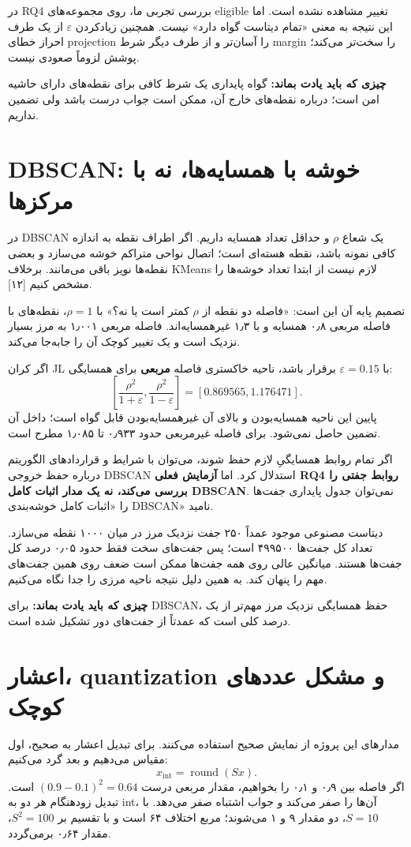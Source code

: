 \documentclass[11pt,a4paper]{article}
\newcommand{\lesson}[1]{\clearpage\section{#1}}
\newcommand{\takeaway}[1]{\par\textbf{چیزی که باید یادت بماند:} #1\par}
\begin{document}
در RQ4 بررسی تجربی ما، روی مجموعه‌های eligible تغییر مشاهده نشده است. اما این نتیجه به معنی «تمام دیتاست گواه دارد» نیست. همچنین زیادکردن \(\varepsilon\) از یک طرف احراز خطای projection را آسان‌تر و از طرف دیگر شرط margin را سخت‌تر می‌کند؛ پوشش لزوماً صعودی نیست.

\takeaway{گواه پایداری یک شرط کافی برای نقطه‌های دارای حاشیه امن است؛ درباره نقطه‌های خارج آن، ممکن است جواب درست باشد ولی تضمین نداریم.}

\lesson{DBSCAN: خوشه با همسایه‌ها، نه با مرکزها}
در DBSCAN یک شعاع \(\rho\) و حداقل تعداد همسایه  داریم. اگر اطراف نقطه به اندازه کافی نمونه باشد، نقطه هسته‌ای است؛ اتصال نواحی متراکم خوشه می‌سازد و بعضی نقطه‌ها نویز باقی می‌مانند. برخلاف KMeans لازم نیست از ابتدا تعداد خوشه‌ها را مشخص کنیم [۱۲].

تصمیم پایه آن این است: «فاصله دو نقطه از \(\rho\) کمتر است یا نه؟» با \(\rho=1\)، نقطه‌های با فاصله مربعی ۰٫۸ همسایه و با ۱٫۳ غیرهمسایه‌اند. فاصله مربعی ۱٫۰۰۱ به مرز بسیار نزدیک است و یک تغییر کوچک آن را جابه‌جا می‌کند.

اگر کران JL با \(\varepsilon=0.15\) برقرار باشد، ناحیه خاکستری فاصله \textbf{مربعی} برای همسایگی:
\[
 \left[\frac{\rho^2}{1+\varepsilon},\frac{\rho^2}{1-\varepsilon}\right]
 =[0.869565,1.176471].
\]
پایین این ناحیه همسایه‌بودن و بالای آن غیرهمسایه‌بودن قابل گواه است؛ داخل آن تضمین حاصل نمی‌شود. برای فاصله غیرمربعی حدود ۰٫۹۳۳ تا ۱٫۰۸۵ مطرح است.

اگر تمام روابط همسایگیِ لازم حفظ شوند، می‌توان با شرایط و قراردادهای الگوریتم درباره حفظ خروجی DBSCAN استدلال کرد. اما \textbf{آزمایش فعلی RQ4 روابط جفتی را بررسی می‌کند، نه یک مدار اثبات کامل DBSCAN}. نمی‌توان جدول پایداری جفت‌ها را «اثبات کامل خوشه‌بندی DBSCAN» نامید.

دیتاست مصنوعی موجود عمداً ۲۵۰ جفت نزدیک مرز در میان ۱۰۰۰ نقطه می‌سازد. تعداد کل جفت‌ها ۴۹۹۵۰۰ است؛ پس جفت‌های سخت فقط حدود ۰٫۰۵ درصد کل جفت‌ها هستند. میانگین عالی روی همه جفت‌ها ممکن است ضعف روی همین جفت‌های مهم را پنهان کند. به همین دلیل نتیجه ناحیه مرزی را جدا نگاه می‌کنیم.

\takeaway{برای DBSCAN، حفظ همسایگی نزدیک مرز مهم‌تر از یک درصد کلی است که عمدتاً از جفت‌های دور تشکیل شده است.}

\lesson{اعشار، quantization و مشکل عددهای کوچک}
مدارهای این پروژه از نمایش صحیح استفاده می‌کنند. برای تبدیل اعشار به صحیح، اول مقیاس می‌دهیم و بعد گرد می‌کنیم:
\[
 x_{\mathrm{int}}=\operatorname{round}(Sx).
\]
اگر فاصله بین ۰٫۹ و ۰٫۱ را بخواهیم، مقدار مربعی درست \((0.9-0.1)^2=0.64\) است. تبدیل زودهنگام هر دو به int، آن‌ها را صفر می‌کند و جواب اشتباه صفر می‌دهد. با \(S=10\)، دو مقدار ۹ و ۱ می‌شوند؛ مربع اختلاف ۶۴ است و با تقسیم بر \(S^2=100\)، مقدار ۰٫۶۴ برمی‌گردد.
\end{document}
